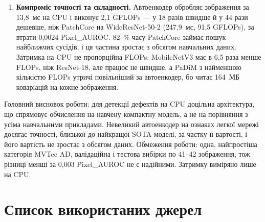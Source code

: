 \documentclass[14pt,a4paper]{extreport}
\begin{document}
\begin{enumerate}
\item \textbf{Компроміс точності та складності.} Автоенкодер обробляє зображення за 13,8~мс на CPU і виконує 2,1 GFLOPs --- у 18 разів швидше й у 44 рази дешевше, ніж PatchCore на WideResNet-50-2 (247,9~мс, 91,5 GFLOPs), за втрати 0,0024 Pixel\_AUROC. 82~\% часу PatchCore займає пошук найближчих сусідів, і ця частина зростає з обсягом навчальних даних. Затримка на CPU не пропорційна FLOPs: MobileNetV3 має в 6,5 раза менше FLOPs, ніж ResNet-18, але працює не швидше, а PaDiM з найменшою кількістю FLOPs утричі повільніший за автоенкодер, бо читає 164~МБ коваріацій на кожне зображення.
\end{enumerate}

Головний висновок роботи: для детекції дефектів на CPU доцільна архітектура, що спрямовує обчислення на навчену компактну модель, а не на порівняння з усіма навчальними прикладами. Невеликий автоенкодер на ознаках легкої мережі досягає точності, близької до найкращої SOTA-моделі, за частку її вартості, і його вартість не зростає з обсягом даних. Обмеження роботи: одна, найпростіша категорія MVTec AD, валідаційна і тестова вибірки по 41--42 зображення, тож різниці менші за 0,003 Pixel\_AUROC не є надійними. Затримку виміряно лише на CPU.

\section*{Список використаних джерел}
\end{document}
